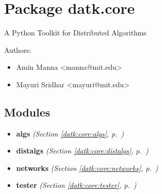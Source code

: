 %
%
%


\section{Package datk.core}

    \label{datk:core}
A Python Toolkit for Distributed Algorithms

Authors:

\begin{itemize}
\setlength{\parskip}{0.6ex}
  \item Amin Manna {\textless}manna@mit.edu{\textgreater}

  \item Mayuri Sridhar {\textless}mayuri@mit.edu{\textgreater}

\end{itemize}



\subsection{Modules}

\begin{itemize}
\setlength{\parskip}{0ex}
\item \textbf{algs}
  \textit{(Section \ref{datk:core:algs}, p.~\pageref{datk:core:algs})}

\item \textbf{distalgs}
  \textit{(Section \ref{datk:core:distalgs}, p.~\pageref{datk:core:distalgs})}

\item \textbf{networks}
  \textit{(Section \ref{datk:core:networks}, p.~\pageref{datk:core:networks})}

\item \textbf{tester}
  \textit{(Section \ref{datk:core:tester}, p.~\pageref{datk:core:tester})}

\end{itemize}


